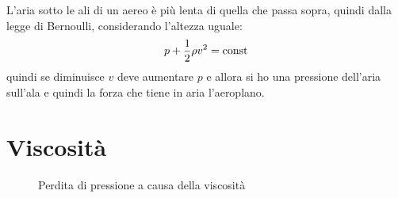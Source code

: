 \begin{Es}
L'aria sotto le ali di un aereo è più lenta di quella che passa sopra, quindi dalla legge di Bernoulli, considerando l'altezza uguale:
\begin{equation*}p+\frac{1}{2}\rho v^2=\text{const}\end{equation*}
quindi se diminuisce $v$ deve aumentare $p$ e allora si ho una pressione dell'aria sull'ala e quindi la forza che tiene in aria l'aeroplano.
\end{Es}
\section{Viscosità}
\label{viscosita fisica1}
\begin{figure}[htbp]
\centering
{}\quad
{}
\caption{Perdita di pressione a causa della viscosità}
\end{figure}

